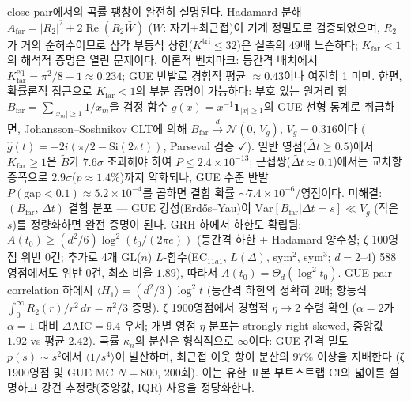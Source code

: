\documentclass[11pt, a4paper]{article}
\theoremstyle{definition}
\theoremstyle{plain}
\begin{document}
\begin{itemize}
        close pair에서의 곡률 팽창이 완전히 설명된다.
        Hadamard 분해 $A_{\mathrm{far}} = |R_2|^2 + 2\operatorname{Re}(R_2\bar W)$
        ($W$: 자기+최근접)이 기계 정밀도로 검증되었으며, $R_2$가 거의 순허수이므로
        삼각 부등식 상한($K^{\mathrm{tri}} \leq 32$)은 실측의 $49$배 느슨하다;
        $K_{\mathrm{far}} < 1$의 해석적 증명은 열린 문제이다.
        이론적 벤치마크: 등간격 배치에서
        $K_{\mathrm{far}}^{\mathrm{eq}} = \pi^2/8 - 1 \approx 0.234$;
        GUE 반발로 경험적 평균 $\approx 0.43$이나 여전히 1 미만.
        한편, 확률론적 접근으로 $K_{\mathrm{far}} < 1$의 부분 증명이 가능하다:
        부호 있는 원거리 합 $B_{\mathrm{far}} = \sum_{|x_m|\ge1} 1/x_m$을
        검정 함수 $g(x) = x^{-1}\mathbf{1}_{|x|\ge1}$의 GUE 선형 통계로 취급하면,
        Johansson--Soshnikov CLT에 의해
        $B_{\mathrm{far}} \xrightarrow{d} \mathcal{N}(0,\,V_g)$,
        $V_g = 0.316$이다
        ($\hat g(t) = -2i(\pi/2 - \mathrm{Si}(2\pi t))$, Parseval 검증 $\checkmark$).
        일반 영점($\widetilde{\Delta t}\ge0.5$)에서 $K_{\mathrm{far}}\ge1$은
        $\tilde{B}$가 $7.6\sigma$ 초과해야 하여
        $P \le 2.4\times10^{-13}$;
        근접쌍($\widetilde{\Delta t}\approx0.1$)에서는
        교차항 증폭으로 $2.9\sigma$($p\approx1.4\%$)까지 약화되나,
        GUE 수준 반발 $P(\text{gap}<0.1)\approx5.2\times10^{-4}$를 곱하면
        결합 확률 $\sim7.4\times10^{-6}$/영점이다.
        미해결: $(B_{\mathrm{far}},\,\Delta t)$ 결합 분포 ---
        GUE 강성(Erd\H{o}s--Yau)이
        $\mathrm{Var}[B_{\mathrm{far}}|\Delta t{=}s] \ll V_g$ (작은 $s$)를
        정량화하면 완전 증명이 된다.
        GRH 하에서 하한도 확립됨: $A(t_0) \geq (d^2/6)\log^2(t_0/(2\pi e))$
        (등간격 하한 + Hadamard 양수성; ζ 100영점 위반 0건;
        추가로 4개 GL($n$) $L$-함수(EC$_{11a1}$, $L(\Delta)$, sym$^2$, sym$^3$;
        $d=2$--$4$) 588영점에서도 위반 0건, 최소 비율 $1.89$),
        따라서 $A(t_0) = \Theta_d(\log^2 t_0)$.
        GUE pair correlation 하에서 $\langle H_1\rangle = (d^2/3)\log^2 t$
        (등간격 하한의 정확히 2배; 항등식 $\int_0^\infty R_2(r)/r^2\,dr = \pi^2/3$ 증명).
        ζ 1900영점에서 경험적 $\eta \to 2$ 수렴 확인
        ($\alpha=2$가 $\alpha=1$ 대비 $\Delta$AIC$=9.4$ 우세;
        개별 영점 $\eta$ 분포는 strongly right-skewed, 중앙값 $1.92$ vs 평균 $2.42$).
        곡률 $\kappa_n$의 분산은 형식적으로 $\infty$이다:
        GUE 간격 밀도 $p(s)\sim s^2$에서 $\langle 1/s^4\rangle$이
        발산하며, 최근접 이웃 항이 분산의 $97\%$ 이상을 지배한다
        (ζ 1900영점 및 GUE MC $N\!=\!800$, 200회).
        이는 유한 표본 부트스트랩 CI의 넓이를 설명하고
        강건 추정량(중앙값, IQR) 사용을 정당화한다.

\end{itemize}
\end{document}
